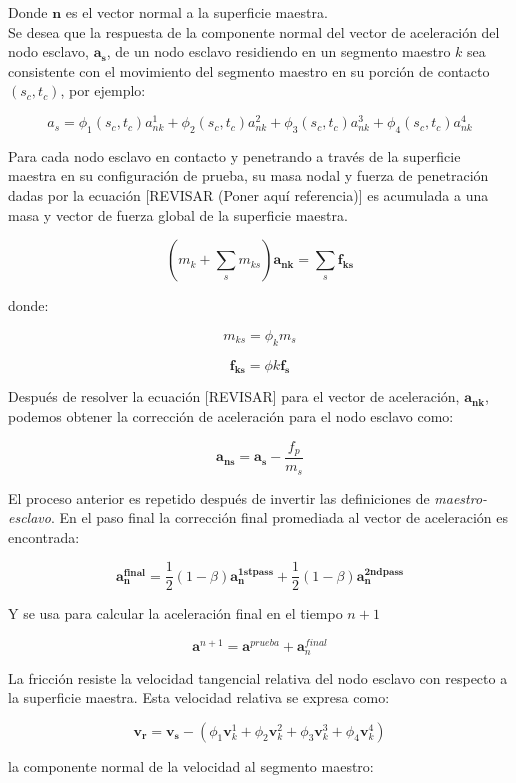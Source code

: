 Donde $\mathbf{n}$ es el vector normal a la superficie maestra.\\

Se desea que la respuesta de la componente normal del vector de aceleración del nodo esclavo, 
$\mathbf{a_s}$, de un nodo esclavo residiendo en un segmento maestro $k$ sea consistente con 
el movimiento del segmento maestro en su porción de contacto $(s_c,t_c)$, por ejemplo:

$$
a_s = \phi_1 (s_c,t_c) a_{nk}^1 + \phi_2 (s_c,t_c) a_{nk}^2 + \phi_3 (s_c,t_c) a_{nk}^3 + \phi_4 (s_c,t_c) a_{nk}^4
$$

Para cada nodo esclavo en contacto y penetrando a través de la superficie maestra en 
su configuración de prueba, su masa nodal y fuerza de penetración dadas por la ecuación 
[REVISAR (Poner aquí referencia)] es acumulada a una masa y vector de fuerza global de 
la superficie maestra.

$$
\left(
m_k + \sum_s m_{ks}
\right)
\mathbf{a_{nk}}
=
\sum_s \mathbf{f_{ks}}
$$

donde:

$$
m_{ks} = \phi_k m_s
$$

$$
\mathbf{f_{ks}} = \phi{k} \mathbf{f_s}
$$

Después de resolver la ecuación [REVISAR] para el vector de aceleración, $\mathbf{a_{nk}}$, podemos 
obtener la corrección de aceleración para el nodo esclavo como:

$$
\mathbf{a_{ns}} = \mathbf{a_s} - \frac{f_p}{m_s}
$$

El proceso anterior es repetido después de invertir las definiciones de \textit{maestro-esclavo}. 
En el paso final la corrección final promediada al vector de aceleración es encontrada:

$$
\mathbf{a_n^{final}} = \frac{1}{2} (1-\beta) \mathbf{a_n^{1st pass}} + 
\frac{1}{2} (1-\beta) \mathbf{a_n^{2nd pass}} 
$$

Y se usa para calcular la aceleración final en el tiempo $n+1$

$$
\mathbf{a}^{n+1} = \mathbf{a}^{prueba} + \mathbf{a}_n^{final}
$$

La fricción resiste la velocidad tangencial relativa del nodo esclavo con respecto a 
la superficie maestra. Esta velocidad relativa se expresa como:

$$
\mathbf{v_r} = \mathbf{v_s} - 
\left(
\phi_1 \mathbf{v}_k^1 + \phi_2 \mathbf{v}_k^2 + \phi_3 \mathbf{v}_k^3 + \phi_4 \mathbf{v}_k^4
\right)
$$

la componente normal de la velocidad al segmento maestro:

